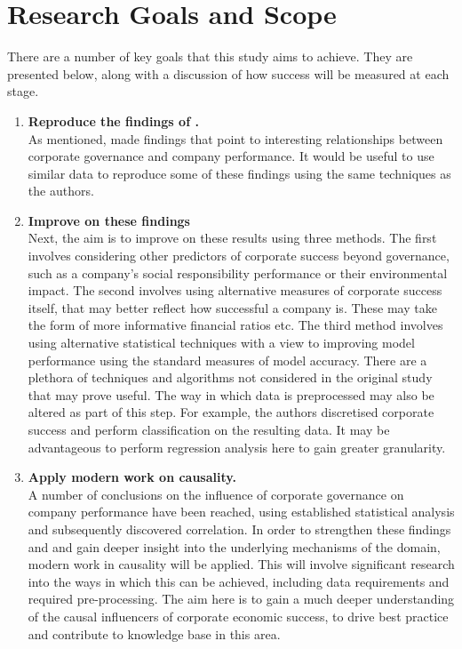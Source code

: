 \section{Research Goals and Scope}{\label{RGAS}}
{There are a number of key goals that this study aims to achieve. They are presented below, along with a discussion of how success will be measured at each stage.
\begin{enumerate}
\item{\bf {Reproduce the findings of \cite{moldovan2015learning}}.}\\
{As mentioned, \cite{moldovan2015learning} made findings that point to interesting relationships between corporate governance and company performance. It would be useful to use similar data to reproduce some of these findings using the same techniques as the authors.}
\item{\bf {Improve on these findings}}\\
Next, the aim is to improve on these results using three methods. The first involves considering other predictors of corporate success beyond governance, such as a company's social responsibility performance or their environmental impact. The second involves using alternative measures of corporate success itself, that may better reflect how successful a company is. These may take the form of more informative financial ratios etc. The third method involves using alternative statistical techniques with a view to improving model performance using the standard measures of model accuracy. There are a plethora of techniques and algorithms not considered in the original study that may prove useful. The way in which data is preprocessed may also be altered as part of this step. For example, the authors discretised corporate success and perform classification on the resulting data. It may be advantageous to perform regression analysis here to gain greater granularity.
\item{\bf {Apply modern work on causality.}}\\
{A number of conclusions on the influence of corporate governance on company performance have been reached, using established statistical analysis and subsequently discovered correlation. In order to strengthen these findings and and gain deeper insight into the underlying mechanisms of the domain, modern work in causality will be applied. This will involve significant research into the ways in which this can be achieved, including data requirements and required pre-processing. The aim here is to gain a much deeper understanding of the causal influencers of corporate economic success, to drive best practice and contribute to knowledge base in this area. }

\end{enumerate}}
